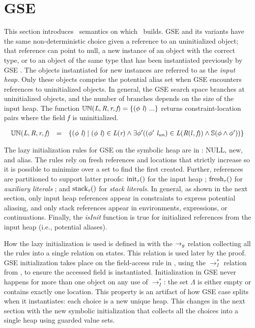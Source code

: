 \section{GSE}
\label{app:gse}
This section introduces \gsetxt\ semantics on which \symtxt\ builds. GSE and its variants have the same non-deterministic choice given a reference to an uninitialized object; that reference can point to null, a new instance of an object with the correct type, or to an object of the same type that has been instantiated previously by GSE \cite{GSE03,KiasanKunit,Cadar:2008,Rosner:2015}. The objects instantiated for new instances are referred to as the \emph{input heap}. Only these objects comprise the potential alias set when GSE encounters references to uninitialized objects. In general, the GSE search space branches at uninitialized objects, and the number of branches depends on the size of the input heap. The function
$\mathbb{UN}(\emph{L}, \emph{R}, \emph{r}, \emph{f}) =
\{(\phi\ \emph{l})\ ...\}$ returns constraint-location
pairs where the field $\emph{f}$ is uninitialized.

\[
\begin{array}{rcl}
\mathbb{UN}(\cfgnt{L}, \cfgnt{R}, \cfgnt{r}, \cfgnt{f}) & = &\{ \lp\phi\ \cfgnt{l}\rp \mid \lp \phi\ \cfgnt{l}\rp  \in \cfgnt{L}\lp \cfgnt{r}\rp  \wedge \exists \phi^\prime \lp \lp \phi^\prime\ \cfgnt{l}_\mathit{un}\rp  \in \cfgnt{L}\lp \cfgnt{R}\lp l,\cfgnt{f}\rp\rp \wedge \mathbb{S}\lp \phi \wedge \phi^\prime \rp\rp\}\\
\end{array}
\]


The lazy initialization rules for GSE on the symbolic heap are in
: NULL, new, and alias. The rules rely on fresh references and locations that strictly increase so it is possible to minimize over a set to find the first created. Further, references are partitioned to support latter proofs: $\mathrm{init}_{\emph{r}}()$ for the input
  heap
  ; $\mathrm{fresh}_{\emph{r}}()$ for \emph{auxiliary
  literals}
  ; and $\mathrm{stack}_{\emph{r}}()$ for \emph{stack
    literals}.
  In general, as shown in the next section,
  only input heap references appear in constraints to express potential aliasing, and only stack references appear in environments, expressions, or continuations.  Finally, the \emph{isInit} function is true for initialized references from the input heap (i.e., potential aliases). 

How the lazy
initialization is used is defined in  with the $\rightarrow_{g}$ relation collecting all the rules into a single relation on states. This relation is used later by the proof. GSE initialization takes place on the field-access rule in ,
using the $\rightarrow_I^*$ relation from , to ensure the accessed field is
instantiated. Initialization in GSE never
happens for more than one object on any use of $\rightarrow_I^*$:
the set $\Lambda$ is either empty or contains exactly one location. This property is an artifact of how GSE case splits when it instantiates: each choice is a new unique heap. This changes in the next section with the new symbolic initialization that collects all the choices into a single heap using guarded value sets.

